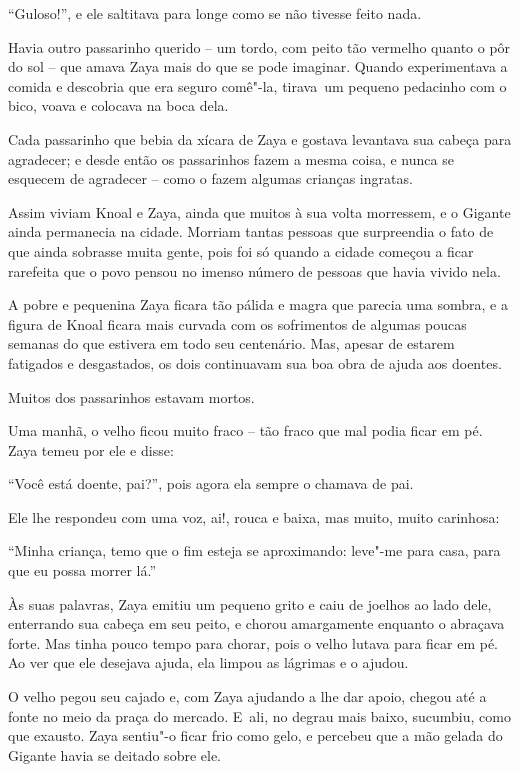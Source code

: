 ``Guloso!'', e ele saltitava para longe como se não tivesse feito nada.

Havia outro passarinho querido -- um tordo, com peito tão vermelho
quanto o pôr do sol -- que amava Zaya mais do que se pode imaginar.
Quando experimentava a comida e descobria que era seguro comê"-la,
tirava~um pequeno pedacinho com o bico, voava e colocava na boca dela.

Cada passarinho que bebia da xícara de Zaya e gostava levantava sua
cabeça para agradecer; e desde então os passarinhos fazem a mesma coisa,
e nunca se esquecem de agradecer -- como o fazem algumas crianças
ingratas.

Assim viviam Knoal e Zaya, ainda que muitos à sua volta morressem, e o
Gigante ainda permanecia na cidade. Morriam tantas pessoas que
surpreendia o fato de que ainda sobrasse muita gente, pois foi só quando
a cidade começou a ficar rarefeita que o povo pensou no imenso número de
pessoas que havia vivido nela.

A pobre e pequenina Zaya ficara tão pálida e magra que parecia uma
sombra, e a figura de Knoal ficara mais curvada com os sofrimentos de
algumas poucas semanas do que estivera em todo seu centenário. Mas,
apesar de estarem fatigados e desgastados, os dois continuavam sua boa
obra de ajuda aos doentes.

Muitos dos passarinhos estavam mortos.

Uma manhã, o velho ficou muito fraco -- tão fraco que mal podia ficar em
pé. Zaya temeu por ele e disse:

``Você está doente, pai?'', pois agora ela sempre o chamava de pai.

Ele lhe respondeu com uma voz, ai!, rouca e baixa, mas muito, muito
carinhosa:

``Minha criança, temo que o fim esteja se aproximando: leve"-me para
casa, para que eu possa morrer lá.''

Às suas palavras, Zaya emitiu um pequeno grito e caiu de joelhos ao lado
dele, enterrando sua cabeça em seu peito, e chorou amargamente enquanto
o abraçava forte. Mas tinha pouco tempo para chorar, pois o velho
lutava para ficar em pé. Ao ver que ele desejava ajuda, ela limpou as
lágrimas e o ajudou.

O velho pegou seu cajado e, com Zaya ajudando a lhe dar apoio, chegou
até a fonte no meio da praça do mercado. E~ali, no degrau mais baixo,
sucumbiu, como que exausto. Zaya sentiu"-o ficar frio como gelo, e
percebeu que a mão gelada do Gigante havia se deitado sobre ele.

